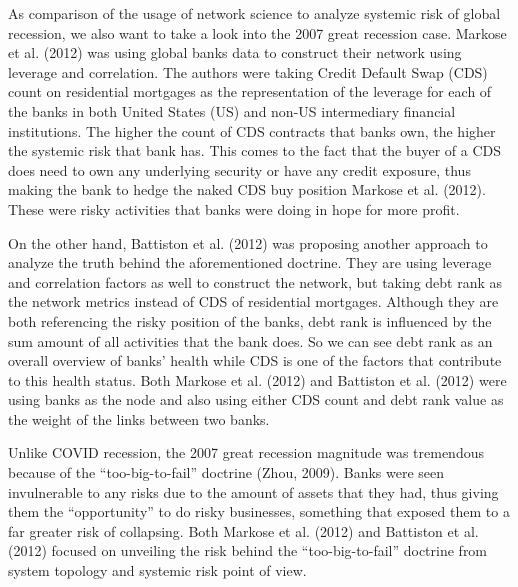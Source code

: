 \documentclass[a4paper,11pt]{article}
\begin{document}
As comparison of the usage of network science to analyze systemic risk of global recession, we also want to take a look into the 2007 great recession case. Markose et al. (2012) was using global banks data to construct their network using leverage and correlation. The authors were taking Credit Default Swap (CDS) count on residential mortgages as the representation of the leverage for each of the banks in both United States (US) and non-US intermediary financial institutions. The higher the count of CDS contracts that banks own, the higher the systemic risk that bank has. This comes to the fact that the buyer of a CDS does need to own any underlying security or have any credit exposure, thus making the bank to hedge the naked CDS buy position Markose et al. (2012). These were risky activities that banks were doing in hope for more profit.

On the other hand, Battiston et al. (2012) was proposing another approach to analyze the truth behind the aforementioned doctrine. They are using leverage and correlation factors as well to construct the network, but taking debt rank as the network metrics instead of CDS of residential mortgages. Although they are both referencing the risky position of the banks, debt rank is influenced by the sum amount of all activities that the bank does. So we can see debt rank as an overall overview of banks’ health while CDS is one of the factors that contribute to this health status. Both Markose et al. (2012) and Battiston et al. (2012) were using banks as the node and also using either CDS count and debt rank value as the weight of the links between two banks.

Unlike COVID recession, the 2007 great recession magnitude was tremendous because of the “too-big-to-fail” doctrine (Zhou, 2009). Banks were seen invulnerable to any risks due to the amount of assets that they had, thus giving them the “opportunity” to do risky businesses, something that exposed them to a far greater risk of collapsing. Both Markose et al. (2012) and Battiston et al. (2012) focused on unveiling the risk behind the “too-big-to-fail” doctrine from system topology and systemic risk point of view.
\end{document}
